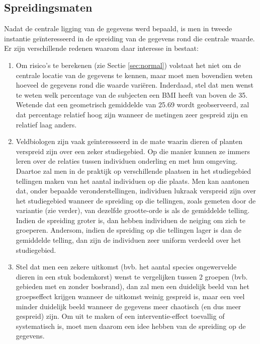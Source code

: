 \documentclass[
  12pt,dutch,coursenotes]{book}
\providecommand{\tightlist}{%
  \setlength{\itemsep}{0pt}\setlength{\parskip}{0pt}}
\theoremstyle{definition}
\theoremstyle{definition}
\theoremstyle{definition}
\theoremstyle{remark}
\begin{document}
\hypertarget{subsec:spreiding}{%
\subsection{Spreidingsmaten}\label{subsec:spreiding}}

Nadat de centrale ligging van de gegevens werd bepaald, is men in tweede
instantie geïnteresseerd in de spreiding van de gegevens rond
die centrale waarde. Er zijn verschillende redenen waarom daar interesse in bestaat:

\begin{enumerate}
\def\labelenumi{\arabic{enumi}.}
\tightlist
\item
  Om risico's te berekenen (zie Sectie \ref{sec:normal}) volstaat het niet om de centrale locatie van de gegevens te kennen, maar moet men bovendien weten hoeveel de gegevens rond die waarde variëren. Inderdaad, stel dat men wenst te weten welk percentage van de subjecten een BMI heeft van boven de 35. Wetende dat een geometrisch gemiddelde van 25.69 wordt geobserveerd, zal dat percentage relatief hoog zijn wanneer de metingen zeer gespreid zijn en relatief laag anders.
\item
  Veldbiologen zijn vaak geïnteresseerd in de mate waarin dieren of planten verspreid zijn over een zeker studiegebied. Op die manier kunnen ze immers leren over de relaties tussen individuen onderling en met hun omgeving. Daartoe zal men in de praktijk op verschillende plaatsen in het studiegebied tellingen maken van het aantal individuen op die plaats. Men kan aantonen dat, onder bepaalde veronderstellingen, individuen lukraak verspreid zijn over het studiegebied wanneer de spreiding op die tellingen, zoals gemeten door de variantie (zie verder), van dezelfde grootte-orde is als de gemiddelde telling. Indien de spreiding groter is, dan hebben individuen de neiging om zich te groeperen. Andersom, indien de spreiding op die tellingen lager is dan de gemiddelde telling, dan zijn de individuen zeer uniform verdeeld over het studiegebied.
\item
  Stel dat men een zekere uitkomst (bvb. het aantal species ongewervelde dieren in een stuk bodemkorst) wenst te vergelijken tussen 2 groepen (bvb. gebieden met en zonder bosbrand), dan zal men een duidelijk beeld van het groepseffect krijgen wanneer de uitkomst weinig gespreid is, maar een veel minder duidelijk beeld wanneer de gegevens meer chaotisch (en dus meer gespreid) zijn. Om uit te maken of een interventie-effect toevallig of systematisch is, moet men daarom een idee hebben van de spreiding op de gegevens.
\end{enumerate}
\end{document}
